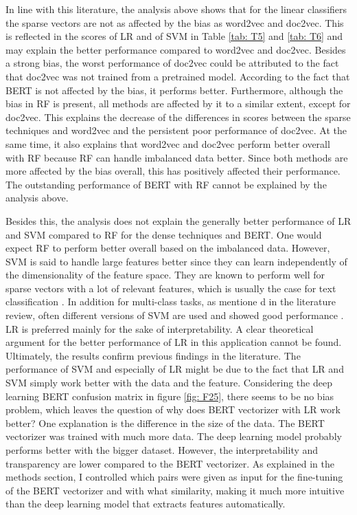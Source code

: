 \documentclass[12pt, a4paper, titlepage]{article}
\begin{document}
In line with this literature, the analysis above shows that for the linear classifiers the sparse vectors are not as affected by the bias as word2vec and doc2vec. This is reflected in the scores of LR and of SVM in Table \ref{tab: T5} and \ref{tab: T6} and may explain the better performance compared to word2vec and doc2vec. Besides a strong bias, the worst performance of doc2vec could be attributed to the fact that doc2vec was not trained from a pretrained model. According to the fact that \ac{BERT} is not affected by the bias, it performs better. Furthermore, although the bias in RF is present, all methods are affected by it to a similar extent, except for doc2vec. This explains the decrease of the differences in scores between the sparse techniques and word2vec and the persistent poor performance of doc2vec. At the same time, it also explains that word2vec and doc2vec perform better overall with RF because RF can handle imbalanced data better. Since both methods are more affected by the bias overall, this has positively affected their performance. The outstanding performance of \ac{BERT} with \ac{RF} cannot be explained by the analysis above.

Besides this, the analysis does not explain the generally better performance of LR and SVM compared to RF for the dense techniques and \ac{BERT}. One would expect RF to perform better overall based on the imbalanced data. However, \ac{SVM} is said to handle large features better since they can learn independently of the dimensionality of the feature space. They are known to perform well for sparse vectors with a lot of relevant features, which is usually the case for text classification \citep{Joachims1998}. In addition for multi-class tasks, as mentione
d in the literature review, often different versions of \ac{SVM} are used and showed good performance \citep{Aiolli2005, Angulo2003,Benabdeslem2006, guo2015, Mayoraz1999,Tang2019,tomar2015comparison}. \ac{LR} is preferred mainly for the sake of interpretability. A clear theoretical argument for the better performance of LR in this application cannot be found. Ultimately, the results confirm previous findings in the literature. The performance of SVM and especially of \ac{LR} might be due to the fact that \ac{LR} and \ac{SVM} simply work better with the data and the feature. Considering the deep learning \ac{BERT} confusion matrix in figure \ref{fig: F25}, there seems to be no bias problem, which leaves the question of why does \ac{BERT} vectorizer with \ac{LR} work better? One explanation is the difference in the size of the data. The \ac{BERT} vectorizer was trained with much more data. The deep learning model probably performs better with the bigger dataset. However, the interpretability and transparency are lower compared to the \ac{BERT} vectorizer. As explained in the methods section, I controlled which pairs were given as input for the fine-tuning of the \ac{BERT} vectorizer and with what similarity, making it much more intuitive than the deep learning model that extracts features automatically. 
\end{document}
